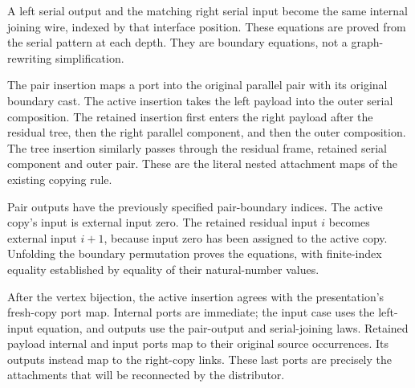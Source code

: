 A left serial output and the matching right serial input become the same
internal joining wire, indexed by that interface position. These equations
are proved from the serial pattern at each depth. They are boundary equations,
not a graph-rewriting simplification.



The pair insertion maps a port into the original parallel pair with its
original boundary cast. The active insertion takes the left payload into the
outer serial composition. The retained insertion first enters the right
payload after the residual tree, then the right parallel component, and then
the outer composition. The tree insertion similarly passes through the residual
frame, retained serial component and outer pair. These are the literal nested
attachment maps of the existing copying rule.





Pair outputs have the previously specified pair-boundary indices. The active
copy's input is external input zero. The retained residual input $i$ becomes
external input $i+1$, because input zero has been assigned to the active copy.
Unfolding the boundary permutation proves the equations, with finite-index
equality established by equality of their natural-number values.




After the vertex bijection, the active insertion agrees with the presentation's
fresh-copy port map. Internal ports are immediate; the input case uses the
left-input equation, and outputs use the pair-output and serial-joining laws.
Retained payload internal and input ports map to their original source
occurrences. Its outputs instead map to the right-copy links. These last
ports are precisely the attachments that will be reconnected by the distributor.

